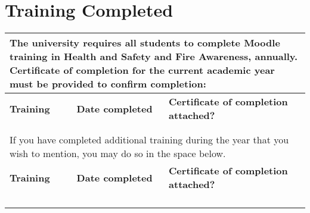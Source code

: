 \newpage
\section{Training Completed}
\begin{table*}[h]
\begin{center}
\begin{tabular}{|p{}|p{}|p{}|}
\toprule
\multicolumn{3}{|p{0.8\textwidth}|}{
The university requires all students to complete Moodle training in Health and Safety and Fire Awareness, annually. Certificate of completion for the current academic year must be provided to confirm completion:
} \\
\midrule
\textbf{Training} & \textbf{Date completed} & \textbf{Certificate of completion attached?} \\
\midrule
 & & \\
\midrule
 & & \\
\midrule
\multicolumn{3}{|p{0.8\textwidth}|}{
If you have completed additional training during the year that you wish to mention, you may do so in the space below.
} \\
\midrule
\textbf{Training} & \textbf{Date completed} & \textbf{Certificate of completion attached?} \\
\midrule
 & & \\
\midrule
 & & \\
\midrule
 & & \\
\midrule
 & & \\
\bottomrule
\end{tabular}
\end{center}
\end{table*}